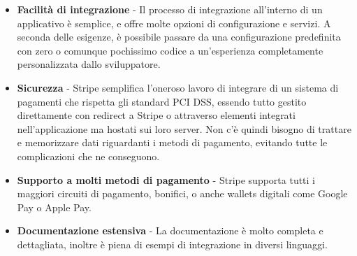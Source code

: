\begin{itemize}
  \item \textbf{Facilit\`a di integrazione} - Il processo di integrazione all'interno di un applicativo \`e semplice, e offre molte opzioni di configurazione e servizi.
    A seconda delle esigenze, \`e possibile passare da una configurazione predefinita con zero o comunque pochissimo codice a un'esperienza completamente personalizzata dallo sviluppatore.
  \item \textbf{Sicurezza} - Stripe semplifica l'oneroso lavoro di integrare di un sistema di pagamenti che rispetta gli standard PCI DSS, essendo tutto gestito
    direttamente con redirect a Stripe o attraverso elementi integrati nell'applicazione ma hostati sui loro server. Non c'\`e quindi bisogno di trattare e memorizzare dati
    riguardanti i metodi di pagamento, evitando tutte le complicazioni che ne conseguono.
  \item \textbf{Supporto a molti metodi di pagamento} - Stripe supporta tutti i maggiori circuiti di pagamento, bonifici, o anche wallets digitali come Google Pay o Apple Pay.
  \item \textbf{Documentazione estensiva} - La documentazione \`e molto completa e dettagliata, inoltre \`e piena di esempi di integrazione in diversi linguaggi.
\end{itemize}
